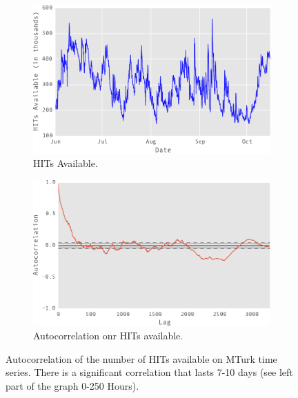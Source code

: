 \begin{figure}[tb]
    \centering
    \begin{subfigure}[b]{0.48\textwidth}
        \centering
        \includegraphics[width=\textwidth]{figures/out}
        \caption{HITs Available.}
        \label{fig:y equals x}
    \end{subfigure}
    \hfill
    \begin{subfigure}[b]{0.48\textwidth}
        \centering
        \includegraphics[width=\textwidth]{figures/out1}
        \caption{Autocorrelation onr HITs available.}
        \label{fig:three sin x}
    \end{subfigure}
    \hfill 
    \caption{Autocorrelation of the number of HITs available on MTurk time series. There is a significant correlation that lasts 7-10 days (see left part of the graph 0-250 Hours).}
	\label{fig:autocorrelation1}
\end{figure}


